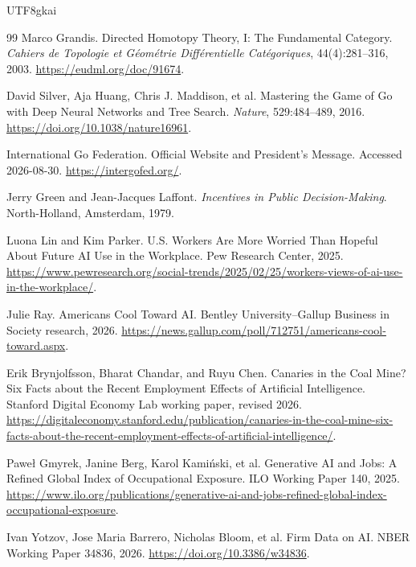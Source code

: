 \documentclass[12pt,a4paper,openany]{report}
\begin{document}
\begin{CJK*}{UTF8}{gkai}
\begin{thebibliography}{99}
Marco Grandis.
\newblock Directed Homotopy Theory, I: The Fundamental Category.
\newblock \emph{Cahiers de Topologie et G\'eom\'etrie Diff\'erentielle Cat\'egoriques},
44(4):281--316, 2003.
\newblock \url{https://eudml.org/doc/91674}.

David Silver, Aja Huang, Chris J. Maddison, et al.
\newblock Mastering the Game of Go with Deep Neural Networks and Tree Search.
\newblock \emph{Nature}, 529:484--489, 2016.
\newblock \url{https://doi.org/10.1038/nature16961}.

International Go Federation.
\newblock Official Website and President's Message.
\newblock Accessed 2026-08-30.
\newblock \url{https://intergofed.org/}.

Jerry Green and Jean-Jacques Laffont.
\newblock \emph{Incentives in Public Decision-Making}.
\newblock North-Holland, Amsterdam, 1979.

Luona Lin and Kim Parker.
\newblock U.S. Workers Are More Worried Than Hopeful About Future AI Use in the Workplace.
\newblock Pew Research Center, 2025.
\newblock \url{https://www.pewresearch.org/social-trends/2025/02/25/workers-views-of-ai-use-in-the-workplace/}.

Julie Ray.
\newblock Americans Cool Toward AI.
\newblock Bentley University--Gallup Business in Society research, 2026.
\newblock \url{https://news.gallup.com/poll/712751/americans-cool-toward.aspx}.

Erik Brynjolfsson, Bharat Chandar, and Ruyu Chen.
\newblock Canaries in the Coal Mine? Six Facts about the Recent Employment Effects of Artificial Intelligence.
\newblock Stanford Digital Economy Lab working paper, revised 2026.
\newblock \url{https://digitaleconomy.stanford.edu/publication/canaries-in-the-coal-mine-six-facts-about-the-recent-employment-effects-of-artificial-intelligence/}.

Pawe\l{} Gmyrek, Janine Berg, Karol Kami\'nski, et al.
\newblock Generative AI and Jobs: A Refined Global Index of Occupational Exposure.
\newblock ILO Working Paper 140, 2025.
\newblock \url{https://www.ilo.org/publications/generative-ai-and-jobs-refined-global-index-occupational-exposure}.

Ivan Yotzov, Jose Maria Barrero, Nicholas Bloom, et al.
\newblock Firm Data on AI.
\newblock NBER Working Paper 34836, 2026.
\newblock \url{https://doi.org/10.3386/w34836}.


\end{thebibliography}
\end{CJK*}
\end{document}
